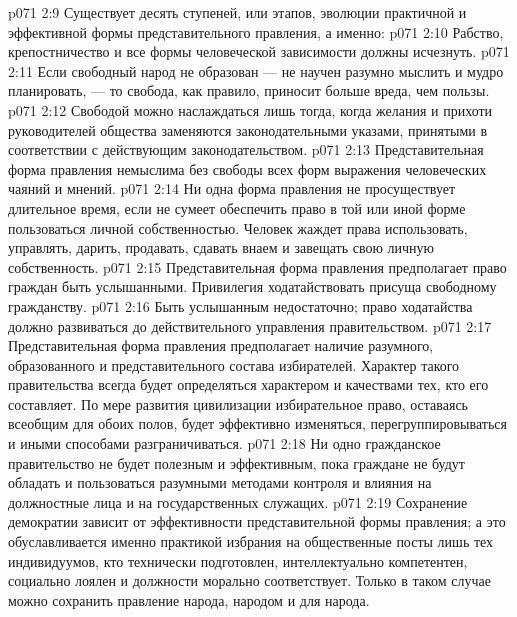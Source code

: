 \vs p071 2:9 \pc Существует десять ступеней, или этапов, эволюции практичной и эффективной формы представительного правления, а именно:
\vs p071 2:10 \bibnobreakspace {} Рабство, крепостничество и все формы человеческой зависимости должны исчезнуть.
\vs p071 2:11 \bibnobreakspace {} Если свободный народ не образован --- не научен разумно мыслить и мудро планировать, --- то свобода, как правило, приносит больше вреда, чем пользы.
\vs p071 2:12 \bibnobreakspace {} Свободой можно наслаждаться лишь тогда, когда желания и прихоти руководителей общества заменяются законодательными указами, принятыми в соответствии с действующим законодательством.
\vs p071 2:13 \bibnobreakspace {} Представительная форма правления немыслима без свободы всех форм выражения человеческих чаяний и мнений.
\vs p071 2:14 \bibnobreakspace {} Ни одна форма правления не просуществует длительное время, если не сумеет обеспечить право в той или иной форме пользоваться личной собственностью. Человек жаждет права использовать, управлять, дарить, продавать, сдавать внаем и завещать свою личную собственность.
\vs p071 2:15 \bibnobreakspace {} Представительная форма правления предполагает право граждан быть услышанными. Привилегия ходатайствовать присуща свободному гражданству.
\vs p071 2:16 \bibnobreakspace {} Быть услышанным недостаточно; право ходатайства должно развиваться до действительного управления правительством.
\vs p071 2:17 \bibnobreakspace {} Представительная форма правления предполагает наличие разумного, образованного и представительного состава избирателей. Характер такого правительства всегда будет определяться характером и качествами тех, кто его составляет. По мере развития цивилизации избирательное право, оставаясь всеобщим для обоих полов, будет эффективно изменяться, перегруппировываться и иными способами разграничиваться.
\vs p071 2:18 \bibnobreakspace {} Ни одно гражданское правительство не будет полезным и эффективным, пока граждане не будут обладать и пользоваться разумными методами контроля и влияния на должностные лица и на государственных служащих.
\vs p071 2:19 \bibnobreakspace {} Сохранение демократии зависит от эффективности представительной формы правления; а это обуславливается именно практикой избрания на общественные посты лишь тех индивидуумов, кто технически подготовлен, интеллектуально компетентен, социально лоялен и должности морально соответствует. Только в таком случае можно сохранить правление народа, народом и для народа.
